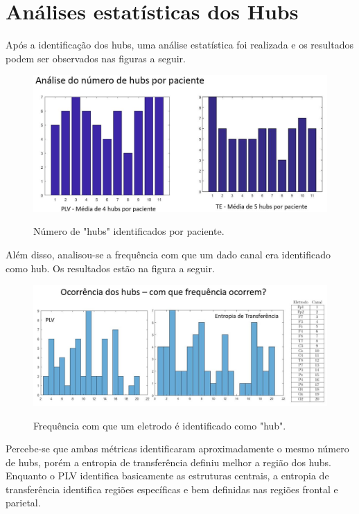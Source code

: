\documentclass[
	12pt,				%
	openright,			%
	twoside,			%
	a4paper,			%
	english,			%
	french,				%
	spanish,			%
	brazil				%
	]{abntex2}
\begin{document}
\section{Análises estatísticas dos Hubs}

Após a identificação dos hubs, uma análise estatística foi realizada e os resultados podem ser observados nas figuras a seguir.

\begin{figure}[h]
\centering
\includegraphics[width=15cm]{figs/hubsporpcte.JPG}
\label{eeg}
\caption{Número de "hubs" identificados por paciente.}
\end{figure}

Além disso, analisou-se a frequência com que um dado canal era identificado como hub. Os resultados estão na figura a seguir.
\begin{figure}[h]
\centering
\includegraphics[width=15cm]{figs/freq.JPG}
\label{eeg}
\caption{Frequência com que um eletrodo é identificado como "hub".}
\end{figure}

Percebe-se que ambas métricas identificaram aproximadamente o mesmo número de hubs, porém a entropia de transferência definiu melhor a região dos hubs. Enquanto o PLV identifica basicamente as estruturas centrais, a entropia de transferência identifica regiões específicas e bem definidas nas regiões frontal e parietal.
\end{document}
